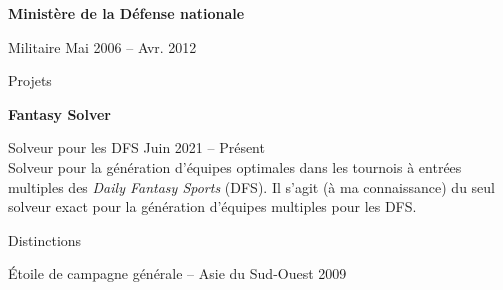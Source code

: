 \documentclass[letterpaper,MMMyyyy,nonstopmode]{simpleresumecv}
\begin{document}
\begin{Body}
\Gap\Gap
\Entry
\textbf{Ministère de la Défense nationale}

Militaire
\hfill
Mai 2006 -- Avr. 2012


\Section
{Projets}{}{}

\Entry
\textbf{Fantasy Solver}

Solveur pour les DFS
\hfill
Juin 2021 -- Présent
\small \\ Solveur pour la génération d'équipes optimales dans les tournois à entrées multiples des \emph{Daily Fantasy Sports} (DFS). Il s'agit (à ma connaissance) du seul solveur exact pour la génération d'équipes multiples pour les DFS.\normalsize


\Section
{Distinctions}{}{}

Étoile de campagne générale – Asie du Sud-Ouest
\hfill
2009










\end{Body}
\end{document}
